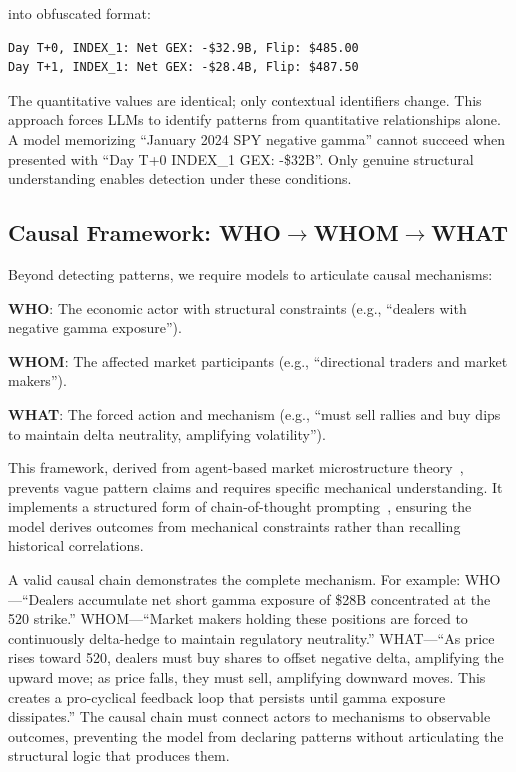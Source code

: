 \noindent into obfuscated format:

\begin{small}
\begin{verbatim}
Day T+0, INDEX_1: Net GEX: -$32.9B, Flip: $485.00
Day T+1, INDEX_1: Net GEX: -$28.4B, Flip: $487.50
\end{verbatim}
\end{small}

The quantitative values are identical; only contextual identifiers change. This approach forces LLMs to identify patterns from quantitative relationships alone. A model memorizing ``January 2024 SPY negative gamma'' cannot succeed when presented with ``Day T+0 INDEX\_1 GEX: -\$32B''. Only genuine structural understanding enables detection under these conditions.

\subsection{Causal Framework: WHO$\rightarrow$WHOM$\rightarrow$WHAT}

Beyond detecting patterns, we require models to articulate causal mechanisms:

\textbf{WHO}: The economic actor with structural constraints (e.g., ``dealers with negative gamma exposure'').

\textbf{WHOM}: The affected market participants (e.g., ``directional traders and market makers'').

\textbf{WHAT}: The forced action and mechanism (e.g., ``must sell rallies and buy dips to maintain delta neutrality, amplifying volatility'').

This framework, derived from agent-based market microstructure theory~\cite{grossman1988liquidity,garleanu2009demand}, prevents vague pattern claims and requires specific mechanical understanding. It implements a structured form of chain-of-thought prompting~\cite{wei2022chain}, ensuring the model derives outcomes from mechanical constraints rather than recalling historical correlations.

A valid causal chain demonstrates the complete mechanism. For example: WHO---``Dealers accumulate net short gamma exposure of \$28B concentrated at the 520 strike.'' WHOM---``Market makers holding these positions are forced to continuously delta-hedge to maintain regulatory neutrality.'' WHAT---``As price rises toward 520, dealers must buy shares to offset negative delta, amplifying the upward move; as price falls, they must sell, amplifying downward moves. This creates a pro-cyclical feedback loop that persists until gamma exposure dissipates.'' The causal chain must connect actors to mechanisms to observable outcomes, preventing the model from declaring patterns without articulating the structural logic that produces them.

